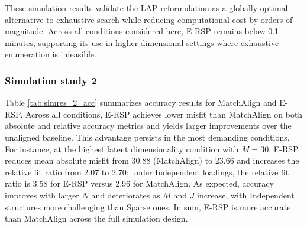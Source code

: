 \documentclass[
  man,
  longtable,
  nolmodern,
  notxfonts,
  notimes,
  colorlinks=true,linkcolor=blue,citecolor=blue,urlcolor=blue]{apa7}
\theoremstyle{plain}
\theoremstyle{plain}
\theoremstyle{remark}
\begin{document}
These simulation results validate the LAP reformulation as a globally
optimal alternative to exhaustive search while reducing computational
cost by orders of magnitude. Across all conditions considered here,
E-RSP remains below 0.1 minutes, supporting its use in
higher-dimensional settings where exhaustive enumeration is infeasible.

\subsubsection{Simulation study 2}\label{simulation-study-2}

Table \ref{tab:simres_2_acc} summarizes accuracy results for MatchAlign
and E-RSP. Across all conditions, E-RSP achieves lower misfit than
MatchAlign on both absolute and relative accuracy metrics and yields
larger improvements over the unaligned baseline. This advantage persists
in the most demanding conditions. For instance, at the highest latent
dimensionality condition with \(M=30\), E-RSP reduces mean absolute
misfit from 30.88 (MatchAlign) to 23.66 and increases the relative fit
ratio from 2.07 to 2.70; under Independent loadings, the relative fit
ratio is 3.58 for E-RSP versus 2.96 for MatchAlign. As expected,
accuracy improves with larger \(N\) and deteriorates as \(M\) and \(J\)
increase, with Independent structures more challenging than Sparse ones.
In sum, E-RSP is more accurate than MatchAlign across the full
simulation design.

\renewcommand{\arraystretch}{0.9}
\end{document}
